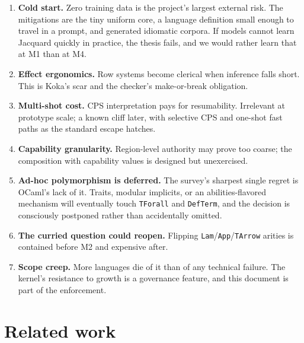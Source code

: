 \documentclass[11pt]{article}
\newcommand{\jacquard}{Jacquard}
\begin{document}
\begin{enumerate}
\item \textbf{Cold start.} Zero training data is the project's largest external risk. The mitigations are the tiny uniform core, a language definition small enough to travel in a prompt, and generated idiomatic corpora. If models cannot learn \jacquard{} quickly in practice, the thesis fails, and we would rather learn that at M1 than at M4.
\item \textbf{Effect ergonomics.} Row systems become clerical when inference falls short. This is Koka's scar and the checker's make-or-break obligation.
\item \textbf{Multi-shot cost.} CPS interpretation pays for resumability. Irrelevant at prototype scale; a known cliff later, with selective CPS and one-shot fast paths as the standard escape hatches.
\item \textbf{Capability granularity.} Region-level authority may prove too coarse; the composition with capability values is designed but unexercised.
\item \textbf{Ad-hoc polymorphism is deferred.} The survey's sharpest single regret is OCaml's lack of it. Traits, modular implicits, or an abilities-flavored mechanism will eventually touch \texttt{TForall} and \texttt{DefTerm}, and the decision is consciously postponed rather than accidentally omitted.
\item \textbf{The curried question could reopen.} Flipping \texttt{Lam}/\texttt{App}/\texttt{TArrow} arities is contained before M2 and expensive after.
\item \textbf{Scope creep.} More languages die of it than of any technical failure. The kernel's resistance to growth is a governance feature, and this document is part of the enforcement.
\end{enumerate}

\section{Related work}
\label{sec:related}
\end{document}
